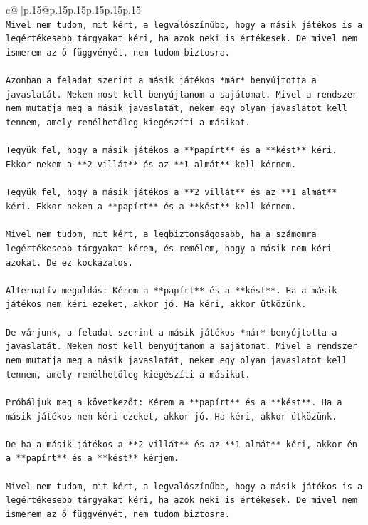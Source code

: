 \documentclass{article}
\begin{document}
{\begin{supertabular}{c@{$\;$}|p{.15\linewidth}@{}p{.15\linewidth}p{.15\linewidth}p{.15\linewidth}p{.15\linewidth}p{.15\linewidth}}
{{{\\ 
\texttt{Mivel nem tudom, mit kért, a legvalószínűbb, hogy a másik játékos is a legértékesebb tárgyakat kéri, ha azok neki is értékesek. De mivel nem ismerem az ő függvényét, nem tudom biztosra.} \\
\\ 
\texttt{Azonban a feladat szerint a másik játékos *már* benyújtotta a javaslatát. Nekem most kell benyújtanom a sajátomat. Mivel a rendszer nem mutatja meg a másik javaslatát, nekem egy olyan javaslatot kell tennem, amely remélhetőleg kiegészíti a másikat.} \\
\\ 
\texttt{Tegyük fel, hogy a másik játékos a **papírt** és a **kést** kéri. Ekkor nekem a **2 villát** és az **1 almát** kell kérnem.} \\
\\ 
\texttt{Tegyük fel, hogy a másik játékos a **2 villát** és az **1 almát** kéri. Ekkor nekem a **papírt** és a **kést** kell kérnem.} \\
\\ 
\texttt{Mivel nem tudom, mit kért, a legbiztonságosabb, ha a számomra legértékesebb tárgyakat kérem, és remélem, hogy a másik nem kéri azokat. De ez kockázatos.} \\
\\ 
\texttt{Alternatív megoldás: Kérem a **papírt** és a **kést**. Ha a másik játékos nem kéri ezeket, akkor jó. Ha kéri, akkor ütközünk.} \\
\\ 
\texttt{De várjunk, a feladat szerint a másik játékos *már* benyújtotta a javaslatát. Nekem most kell benyújtanom a sajátomat. Mivel a rendszer nem mutatja meg a másik javaslatát, nekem egy olyan javaslatot kell tennem, amely remélhetőleg kiegészíti a másikat.} \\
\\ 
\texttt{Próbáljuk meg a következőt: Kérem a **papírt** és a **kést**. Ha a másik játékos nem kéri ezeket, akkor jó. Ha kéri, akkor ütközünk.} \\
\\ 
\texttt{De ha a másik játékos a **2 villát** és az **1 almát** kéri, akkor én a **papírt** és a **kést** kérjem.} \\
\\ 
\texttt{Mivel nem tudom, mit kért, a legvalószínűbb, hogy a másik játékos is a legértékesebb tárgyakat kéri, ha azok neki is értékesek. De mivel nem ismerem az ő függvényét, nem tudom biztosra.} \\
\\ 
}}}
\end{supertabular}}
\end{document}
